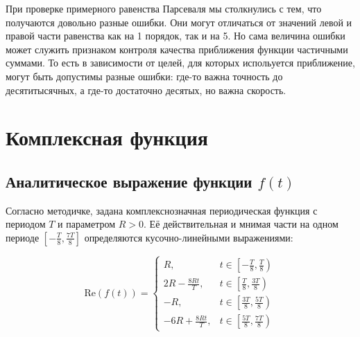 \documentclass[a4paper, 12pt]{article}
\begin{document}
При проверке примерного равенства Парсеваля мы столкнулись с тем, что получаются довольно разные ошибки. Они могут отличаться от значений левой и правой части равенства как на 1 порядок, так и на 5. Но сама величина ошибки может служить признаком контроля качества приближения функции частичными суммами. То есть в зависимости от целей, для которых испольуется приближение, могут быть допустимы разные ошибки: где-то важна точность до десятитысячных, а где-то достаточно десятых, но важна скорость.




\newpage
\section{Комплексная функция}

\subsection{Аналитическое выражение функции \( f(t) \)}

Согласно методичке, задана комплекснозначная периодическая функция с периодом \( T \) и параметром \( R > 0 \). Её действительная и мнимая части на одном периоде \( \left[-\frac{T}{8}, \frac{7T}{8}\right] \) определяются кусочно-линейными выражениями:

\[
\text{Re}(f(t)) =
\begin{cases}
R, & t \in \left[-\frac{T}{8}, \frac{T}{8}\right) \\
2R - \frac{8Rt}{T}, & t \in \left[\frac{T}{8}, \frac{3T}{8}\right) \\
-R, & t \in \left[\frac{3T}{8}, \frac{5T}{8}\right) \\
-6R + \frac{8Rt}{T}, & t \in \left[\frac{5T}{8}, \frac{7T}{8}\right)
\end{cases}
\]
\end{document}
